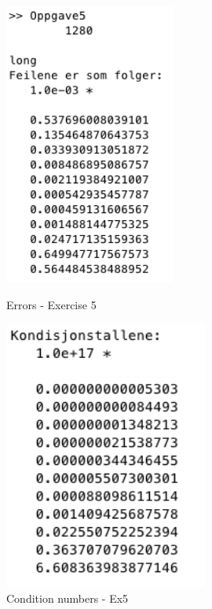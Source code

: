 \vspace{3mm}

\begin{figure}[h]
\centering
\begin{minipage}{.5\textwidth}
  \centering
  \includegraphics[width=0.5\textwidth]{sections/Exercise5/result5}
    \caption{Errors - Exercise 5}
    \label{fig:result5}
\end{minipage}%
\begin{minipage}{.5\textwidth}
  \centering
  \includegraphics[width=0.6\textwidth]{sections/Exercise5/cond5}
    \caption{Condition numbers - Ex5}
    \label{fig:cond5}
\end{minipage}
\end{figure}

